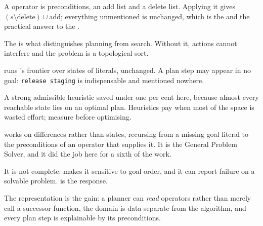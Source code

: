 \begin{chaptersummary}
\begin{tight}
  \item A  operator is preconditions, an add list and a delete list.
        Applying it gives $(s \setminus \mathrm{delete}) \cup \mathrm{add}$;
        everything unmentioned is unchanged, which is the 
        and the practical answer to the .
  \item The  is what distinguishes planning from search. Without
        it, actions cannot interfere and the problem is a topological sort.
  \item {} runs 's frontier over states of
        literals, unchanged. A plan step may appear in no goal:
        \texttt{release staging} is indispensable and mentioned nowhere.
  \item A strong admissible heuristic saved under one per cent here, because almost
        every reachable state lies on an optimal plan. Heuristics pay when most of
        the space is wasted effort; measure before optimising.
  \item {} works on differences rather than states,
        recursing from a missing goal literal to the preconditions of an operator
        that supplies it. It is the General Problem Solver, and it did the job here
        for a sixth of the work.
  \item It is not complete:  makes it sensitive to goal
        order, and it can report failure on a solvable problem.
         is the response.
  \item The representation is the gain: a planner can \emph{read} operators rather
        than merely call a successor function, the domain is data separate from the
        algorithm, and every plan step is explainable by its preconditions.
\end{tight}
\end{chaptersummary}


